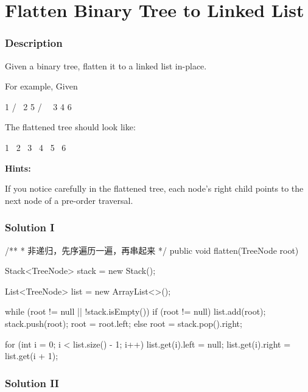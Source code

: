 \newpage

\section{Flatten Binary Tree to Linked List} %

\subsubsection{Description}
Given a binary tree, flatten it to a linked list in-place.

For example, Given
\begin{Code}
         1
        / \
       2   5
      / \   \
     3   4   6
\end{Code}

The flattened tree should look like:
\begin{Code}
   1
    \
     2
      \
       3
        \
         4
          \
           5
            \
             6
\end{Code}

\textbf{Hints:}

If you notice carefully in the flattened tree, each node's right child points to the next node of a pre-order traversal.

\subsubsection{Solution I}

\begin{Code}
/**
 * 非递归，先序遍历一遍，再串起来
 */
public void flatten(TreeNode root) {
    Stack<TreeNode> stack = new Stack();

    List<TreeNode> list = new ArrayList<>();

    while (root != null || !stack.isEmpty()) {
        if (root != null) {
            list.add(root);
            stack.push(root);
            root = root.left;
        } else {
            root = stack.pop().right;
        }
    }

    for (int i = 0; i < list.size() - 1; i++) {
        list.get(i).left = null;
        list.get(i).right = list.get(i + 1);
    }
}
\end{Code}

\subsubsection{Solution II}

